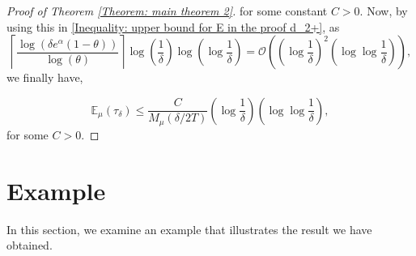 \documentclass[11pt, reqno]{amsart}
\theoremstyle{plain}%
\theoremstyle{definition}
\theoremstyle{definition}
\def\E{\mathbb E}
\numberwithin{equation}{section}
\begin{document}
\begin{proof}[ Proof of Theorem \ref{Theorem: main theorem 2}]
for some constant $C>0$. Now, by using this in \eqref{Inequality: upper bound for E in the proof d_2+}, as $$\left\lceil\frac{\log(\delta e^\alpha (1-\theta))}{\log(\theta)}\right\rceil\log\left(\frac{1}{\delta}\right)\log\left(\log\frac{1}{\delta}\right)=\mathcal{O}\left(  \left(\log\frac{1}{\delta}\right)^2\left(\log\log\frac{1}{\delta}\right) \right),$$ we finally have,

$$\E_\mu(\tau_\delta)\le \frac{C}{M_{\mu}(\delta/2T)} \left(\log\frac{1}{\delta}\right)\left(\log\log\frac{1}{\delta}\right), $$
for some $C>0$.
\end{proof}


















\section{Example}\label{Section: Examples}
In this section, we examine an example that illustrates the result we have obtained.

\end{document}
